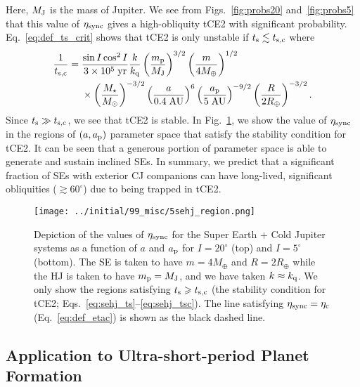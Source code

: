 \documentclass[
        fleqn,
        usenatbib,
    ]{mnras}
\newcommand*{\p}[1]{\left(#1\right)}
\begin{document}
Here, $M_{\rm J}$ is the mass of Jupiter. We see from Figs.~\ref{fig:probs20}
and~\ref{fig:probs5} that this value of $\eta_{\rm sync}$ gives a high-obliquity
tCE2 with significant probability. Eq.~\eqref{eq:def_ts_crit} shows that tCE2 is
only unstable if $t_{\rm s} \lesssim t_{\rm s, c}$ where
\begin{align}
    \frac{1}{t_{\rm s, c}} ={}& \frac{\sin I \cos^2 I}{3 \times
        10^5\;\mathrm{yr}}
            \frac{k}{k_{\rm q}}
            \p{\frac{m_{\rm p}}{M_{\rm J}}}^{3/2}
            \p{\frac{m}{4 M_{\oplus}}}^{1/2}\nonumber\\
        &\times \p{\frac{M_\star}{M_{\odot}}}^{-3/2}
            \p{\frac{a}{0.4\;\mathrm{AU}}}^6
            \p{\frac{a_{\rm p}}{5\;\mathrm{AU}}}^{-9/2}
            \p{\frac{R}{2 R_{\oplus}}}^{-3/2}.
            \label{eq:sehj_tsc}
\end{align}
Since $t_{\rm s} \gg t_{\rm s, c}$, we see that tCE2 is stable. In
Fig.~\ref{fig:sehj_region}, we show the value of $\eta_{\rm sync}$ in the
regions of $\p{a, a_{\rm p}}$ parameter space that satisfy the stability
condition for tCE2. It can be seen that a generous portion of parameter space is
able to generate and sustain inclined SEs. In summary, we predict that a
significant fraction of SEs with exterior CJ companions can have long-lived,
significant obliquities ($\gtrsim 60^\circ$) due to being trapped in tCE2.
\begin{figure}
    \centering
    \texttt{[image: ../initial/99\_misc/5sehj\_region.png]}
    \caption{Depiction of the values of $\eta_{\rm sync}$ for the Super Earth +
    Cold Jupiter systems as a function of $a$ and $a_{\rm p}$ for $I = 20^\circ$
    (top) and $I = 5^\circ$ (bottom). The SE is taken to have
    $m = 4M_{\oplus}$ and $R = 2R_{\oplus}$ while the HJ is taken to have
    $m_{\rm p} = M_{\rm J}$, and we have taken $k \approx k_{\rm q}$. We only
    show the regions satisfying $t_{\rm s} \geq t_{\rm s, c}$ (the stability
    condition for tCE2; Eqs.~\ref{eq:sehj_ts}--\ref{eq:sehj_tsc}). The line
    satisfying $\eta_{\rm sync} = \eta_{\rm c}$ (Eq.~\ref{eq:def_etac}) is shown
    as the black dashed line.}\label{fig:sehj_region}
\end{figure}

\subsection{Application to Ultra-short-period Planet Formation
}\label{ss:disc_usp}
\end{document}
